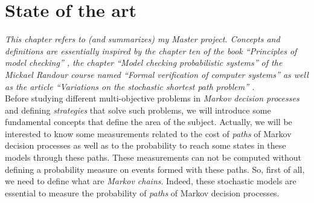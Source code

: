\chapter{State of the art}
\textit{This chapter refers to (and summarizes) my Master project. Concepts and definitions are essentially inspired by the chapter ten of the book ``Principles of model checking'' \cite{PMC}, the chapter ``Model checking probabilistic systems'' of the Mickael Randour course named ``Formal verification of computer systems'' \cite{MRV} as well as the article ``Variations on the stochastic shortest path problem'' \cite{DBLP:journals/corr/RandourRS14a}.} \\

Before studying different multi-objective problems in \textit{Markov decision
processes} and defining \textit{strategies} that solve such problems, we will introduce some fundamental concepts that define the area of the subject.
Actually, we will be interested to know some measurements related to the cost of \textit{paths} of Markov decision processes as well as to the probability to reach some states in these models through these paths.
These measurements can not be computed without defining a probability measure on events formed with these paths.
So, first of all, we need to define what are \textit{Markov chains}. Indeed, these
stochastic models are essential to measure the probability of \textit{paths} of Markov decision processes.

